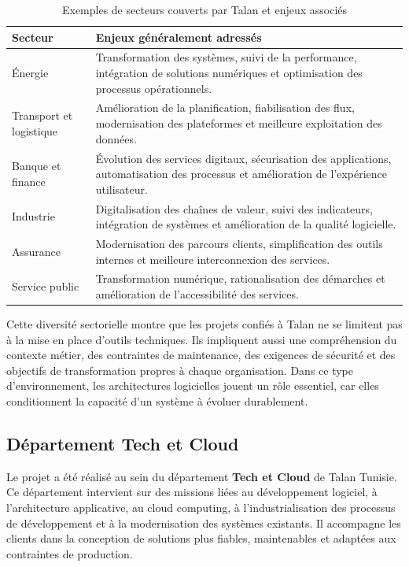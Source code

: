 \begingroup
\renewcommand{\arraystretch}{1.25}
\begin{longtable}{|p{3.6cm}|p{10.4cm}|}
\caption{Exemples de secteurs couverts par Talan et enjeux associés}\label{tab:secteurs-talan}\\
\hline
\textbf{Secteur} & \textbf{Enjeux généralement adressés} \\
\hline
Énergie & Transformation des systèmes, suivi de la performance, intégration de solutions numériques et optimisation des processus opérationnels. \\
\hline
Transport et logistique & Amélioration de la planification, fiabilisation des flux, modernisation des plateformes et meilleure exploitation des données. \\
\hline
Banque et finance & Évolution des services digitaux, sécurisation des applications, automatisation des processus et amélioration de l'expérience utilisateur. \\
\hline
Industrie & Digitalisation des chaînes de valeur, suivi des indicateurs, intégration de systèmes et amélioration de la qualité logicielle. \\
\hline
Assurance & Modernisation des parcours clients, simplification des outils internes et meilleure interconnexion des services. \\
\hline
Service public & Transformation numérique, rationalisation des démarches et amélioration de l'accessibilité des services. \\
\hline
\end{longtable}
\endgroup

Cette diversité sectorielle montre que les projets confiés à Talan ne se limitent pas à la mise en place d'outils techniques. Ils impliquent aussi une compréhension du contexte métier, des contraintes de maintenance, des exigences de sécurité et des objectifs de transformation propres à chaque organisation. Dans ce type d'environnement, les architectures logicielles jouent un rôle essentiel, car elles conditionnent la capacité d'un système à évoluer durablement.

\subsection{Département Tech et Cloud}

Le projet a été réalisé au sein du département \textbf{Tech et Cloud} de Talan Tunisie. Ce département intervient sur des missions liées au développement logiciel, à l'architecture applicative, au cloud computing, à l'industrialisation des processus de développement et à la modernisation des systèmes existants. Il accompagne les clients dans la conception de solutions plus fiables, maintenables et adaptées aux contraintes de production.


